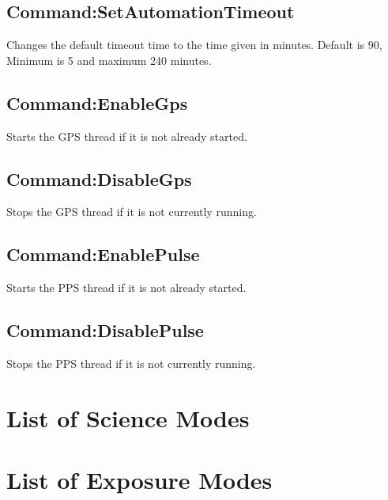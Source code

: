 \subsection{Command:SetAutomationTimeout}

Changes the default timeout time to the time given in minutes. Default is 90, Minimum is 5 and maximum 240 minutes.

\subsection{Command:EnableGps}

Starts the GPS thread if it is not already started.

\subsection{Command:DisableGps}

Stops the GPS thread if it is not currently running.

\subsection{Command:EnablePulse}

Starts the PPS thread if it is not already started.

\subsection{Command:DisablePulse}

Stops the PPS thread if it is not currently running.

\section{List of Science Modes}
\label{sec:B.2:ScienceModes}

\section{List of Exposure Modes}
\label{sec:B.3:ExposureModes}